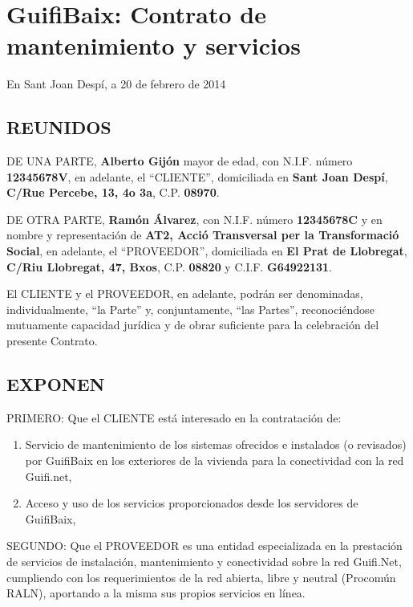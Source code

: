 \documentclass['12pt',spanish,a4paper,]{article}
\author{}
\date{}
\begin{document}
\section{GuifiBaix: Contrato de mantenimiento y
servicios}\label{guifibaix-contrato-de-mantenimiento-y-servicios}

En Sant Joan Despí, a 20 de febrero de 2014

\subsection{REUNIDOS}\label{reunidos}

DE UNA PARTE, \textbf{Alberto Gijón} mayor de edad, con N.I.F. número
\textbf{12345678V}, en adelante, el ``CLIENTE'', domiciliada en
\textbf{Sant Joan Despí}, \textbf{C/Rue Percebe, 13, 4o 3a}, C.P.
\textbf{08970}.

DE OTRA PARTE, \textbf{Ramón Álvarez}, con N.I.F. número
\textbf{12345678C} y en nombre y representación de \textbf{AT2, Acció
Transversal per la Transformació Social}, en adelante, el ``PROVEEDOR'',
domiciliada en \textbf{El Prat de Llobregat}, \textbf{C/Riu Llobregat,
47, Bxos}, C.P. \textbf{08820} y C.I.F. \textbf{G64922131}.

El CLIENTE y el PROVEEDOR, en adelante, podrán ser denominadas,
individualmente, ``la Parte'' y, conjuntamente, ``las Partes'',
reconociéndose mutuamente capacidad jurídica y de obrar suficiente para
la celebración del presente Contrato.

\subsection{EXPONEN}\label{exponen}

PRIMERO: Que el CLIENTE está interesado en la contratación de:

\begin{enumerate}
\def\labelenumi{\alph{enumi})}
\itemsep1pt\parskip0pt
\item
  Servicio de mantenimiento de los sistemas ofrecidos e instalados (o
  revisados) por GuifiBaix en los exteriores de la vivienda para la
  conectividad con la red Guifi.net,
\item
  Acceso y uso de los servicios proporcionados desde los servidores de
  GuifiBaix,
\end{enumerate}

SEGUNDO: Que el PROVEEDOR es una entidad especializada en la prestación
de servicios de instalación, mantenimiento y conectividad sobre la red
Guifi.Net, cumpliendo con los requerimientos de la red abierta, libre y
neutral (Procomún RALN), aportando a la misma sus propios servicios en
línea.
\end{document}

